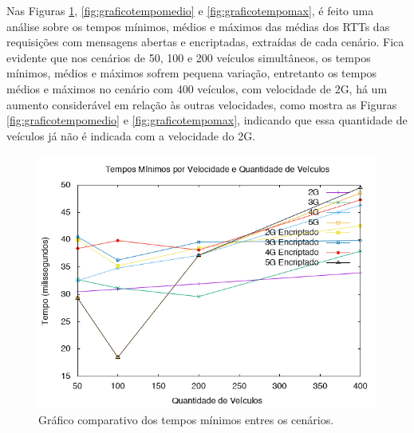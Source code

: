 \documentclass[
	12pt,				%
	oneside,			%
	a4paper,			%
	english,			%
	brazil				%
	]{abntex2ppgsi}
\begin{document}

Nas Figuras \ref{fig:graficotempomin},  \ref{fig:graficotempomedio} e  \ref{fig:graficotempomax}, é feito uma análise sobre os tempos mínimos, médios e máximos das médias dos RTTs das requisições com mensagens abertas e encriptadas, extraídas de cada cenário. Fica evidente que nos cenários de 50, 100 e 200 veículos simultâneos, os tempos mínimos, médios e máximos sofrem pequena variação, entretanto os tempos médios e máximos no cenário com 400 veículos, com velocidade de 2G, há um aumento considerável em relação às outras velocidades, como mostra as Figuras \ref{fig:graficotempomedio} e  \ref{fig:graficotempomax}, indicando que essa quantidade de veículos já não é indicada com a velocidade do 2G.

\begin{figure}[h!]
	\centering
	\includegraphics[width=0.7\columnwidth]{images/grafico_tempo_min.png}
	\caption{Gráfico comparativo dos tempos mínimos entres os cenários.}
	\label{fig:graficotempomin}
\end{figure}
\end{document}
